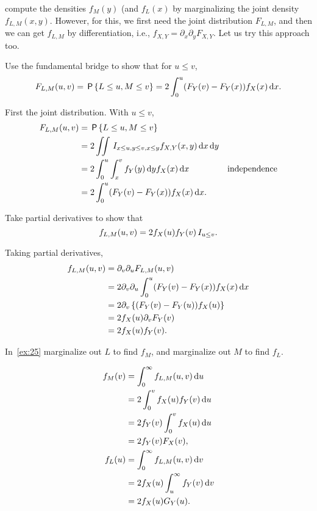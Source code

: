  compute the densities $f_{M}(y)$ (and $f_{L}(x)$ by marginalizing the joint density $f_{L,M}(x,y)$.
However, for this, we first need the joint distribution $F_{L,M}$, and then we can get $f_{L,M}$ by differentiation, i.e., $f_{X,Y} = \partial_{x}\partial_y F_{X,Y}$. Let us try this approach too.


\begin{exercise}
Use the fundamental bridge to show that for $u\leq v$,
\begin{equation*}
  F_{L,M}(u,v) = \,\mathsf{P}\left\{L\leq u, M\leq v\right\} = 2\int_0^u (F_Y(v)- F_Y(x)) f_X(x) \,\textrm{d}x.
\end{equation*}
\begin{solution}
First the joint distribution. With $u\leq v$,
  \begin{align*}
F_{L,M}(u,v) &= \,\mathsf{P}\left\{L\leq u, M \leq v\right\} \\
&= 2\iint \,I_{x \leq u, y\leq v, x\leq y} f_{X,Y}(x,y)\,\textrm{d}x \,\textrm{d}y \\
&= 2\int_0^u \int_x^v f_Y(y) \,\textrm{d}y f_X(x) \,\textrm{d}x & \text{independence} \\
&= 2\int_0^u (F_Y(v)- F_Y(x)) f_X(x) \,\textrm{d}x.
  \end{align*}
\end{solution}
\end{exercise}

\begin{exercise}\label{ex:25}
Take partial derivatives to show that
\begin{equation*}
f_{L,M}(u,v) = 2f_X(u) f_Y(v)\,I_{u\leq v}.
\end{equation*}
\begin{solution}
Taking partial derivatives,
\begin{align*}
f_{L,M}(u,v)
&=\partial_v\partial_{u}F_{L,M}(u,v) \\
&=2 \partial_v\partial_{u} \int_0^u (F_Y(v)- F_Y(x)) f_X(x) \,\textrm{d}x  \\
&=2 \partial_v \left\{(F_Y(v)- F_Y(u)) f_X(u) \right \}  \\
&=2 f_X(u)\partial_v F_Y(v)  \\
&=2 f_X(u)f_Y(v).
\end{align*}
\end{solution}
\end{exercise}


\begin{exercise}
In~\cref{ex:25} marginalize out $L$ to find $f_M$, and marginalize out $M$ to find $f_L$.
\begin{solution}
\begin{align*}
  f_M(v) &=  \int_0^{\infty} f_{L,M}(u,v) \,\textrm{d}u \\
&= 2 \int_0^{v} f_{X}(u) f_Y(v) \,\textrm{d}u \\
&= 2 f_Y(v) \int_0^{v} f_{X}(u) \,\textrm{d}u  \\
&= 2f_Y(v) F_X(v), \\
f_L(u) &=  \int_0^{\infty} f_{L,M}(u,v) \,\textrm{d}v \\
&= 2 f_{X}(u) \int_u^{\infty} f_Y(v) \,\textrm{d}v \\
&= 2 f_{X}(u) G_{Y}(u).
\end{align*}
\end{solution}
\end{exercise}


